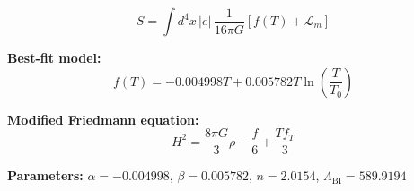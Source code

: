 
\begin{equation}
  S = \int d^4x \, |e| \, \frac{1}{16\pi G} \left[ f(T) + \mathcal{L}_m \right]
\end{equation}

\textbf{Best-fit model:}
\begin{equation}
  f(T) = -0.004998 T + 0.005782 T \ln\!\left(\frac{T}{T_0}\right)
\end{equation}

\textbf{Modified Friedmann equation:}
\begin{equation}
  H^2 = \frac{8\pi G}{3} \rho - \frac{f}{6} + \frac{T f_T}{3}
\end{equation}

\textbf{Parameters:}
$\alpha = -0.004998$, \quad
$\beta = 0.005782$, \quad
$n = 2.0154$, \quad
$\Lambda_{\text{BI}} = 589.9194$